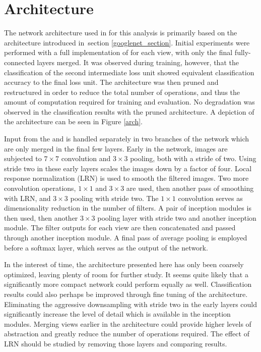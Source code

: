 \section{Architecture}

The network architecture used in for this analysis is primarily based on
the \googlenet architecture \cite{szegedy2014going} introduced in section
\ref{googlenet_section}.
Initial experiments were performed with a full implementation of \googlenet
for each view, with only the final fully-connected layers merged.
It was observed during training, however,
that the classification of the second intermediate
loss unit showed equivalent classification accuracy to the final loss unit.
The architecture was then pruned and restructured in order to reduce
the total number of operations, and thus the amount of computation required
for training and evaluation.
No degradation was observed in the classification results with the pruned
architecture.
A depiction of the architecture can be seen in Figure \ref{arch}.

Input from the \xview and \yview is handled separately in two branches of the
network which are only merged in the final few layers.
Early in the network, images are subjected to $7\times7$ convolution and
$3\times3$ pooling, both with a stride of two.
Using stride two in these early layers scales the images down by a factor of
four.
Local response normalization (LRN) \cite{krizhevsky2012imagenet} is used
to smooth the filtered images.  Two more convolution operations, $1\times1$
and $3\times3$ are used, then another pass of smoothing with LRN, and
$3\times3$ pooling with stride two.  The $1\times1$ convolution serves
as dimensionality reduction in the number of filters.
A pair of inception modules is then used, then another $3\times3$ pooling layer
with stride two and another inception module.  The filter outputs for each view
are then concatenated and passed through another inception module.  A final
pass of average pooling is employed before a softmax layer, which serves as
the output of the network.


In the interest of time, the architecture presented here has only been coarsely
optimized, leaving plenty of room for further study.
It seems quite likely that a significantly more compact network could perform
equally as well.
Classification results could also perhaps be improved through fine tuning of
the architecture.
Eliminating the aggressive downsampling with stride two in the early layers
could significantly increase the level of detail which is available in the
inception modules.
Merging views earlier in the architecture could provide higher levels of
abstraction and greatly reduce the number of operations required.
The effect of LRN should be studied by removing those layers and
comparing results.


